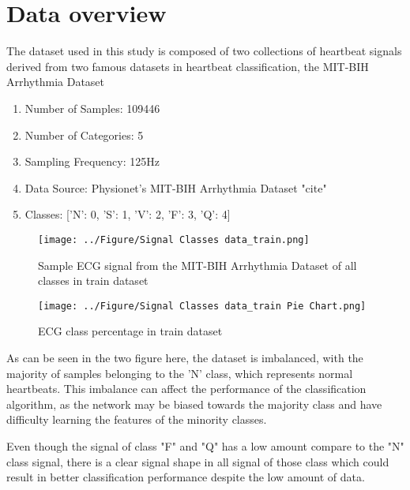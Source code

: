 \documentclass[14pt]{extreport}
\begin{document}
\section{Data overview}
The dataset used in this study is composed of two collections of heartbeat signals derived from two famous datasets in heartbeat classification, the MIT-BIH Arrhythmia Dataset

\begin{enumerate}
    \item[\textbullet] Number of Samples: 109446
    \item[\textbullet] Number of Categories: 5
    \item[\textbullet] Sampling Frequency: 125Hz
    \item[\textbullet] Data Source: Physionet's MIT-BIH Arrhythmia Dataset {"cite"}
    \item[\textbullet] Classes: ['N': 0, 'S': 1, 'V': 2, 'F': 3, 'Q': 4]
\end{enumerate}

\begin{figure}[H]
    \centering
    \captionsetup{justification=centering,margin=2cm}
    \texttt{[image: ../Figure/Signal Classes data\_train.png]}
    \caption{Sample ECG signal from the MIT-BIH Arrhythmia Dataset of all classes in train dataset}
    \label{ECG sample train}
\end{figure}

\begin{figure}[H]
    \centering
    \captionsetup{justification=centering,margin=2cm}
    \texttt{[image: ../Figure/Signal Classes data\_train Pie Chart.png]}
    \caption{ECG class percentage in train dataset}
    \label{ECG train percentage}
\end{figure}

As can be seen in the two figure here, the dataset is imbalanced, with the majority of samples belonging to the 'N' class, which represents normal heartbeats. This imbalance can affect the performance of the classification algorithm, as the network may be biased towards the majority class and have difficulty learning the features of the minority classes.

Even though the signal of class "F" and "Q" has a low amount compare to the "N" class signal, there is a clear signal shape in all signal of those class  which could result in better classification performance despite the low amount of data.
\end{document}
